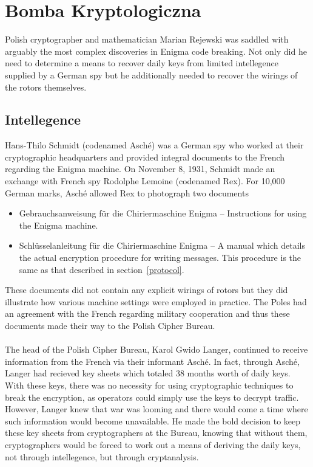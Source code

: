 \chapter{Bomba Kryptologiczna}

Polish cryptographer and mathematician Marian Rejewski was saddled with arguably the most complex discoveries in
Enigma code breaking. Not only did he need to determine a means to
recover daily keys from limited intellegence supplied by a German spy but he
additionally needed to recover the wirings of the rotors themselves.

\section{Intellegence}

Hans-Thilo Schmidt (codenamed Asché) was a German spy who worked at their cryptographic headquarters and provided integral documents to the French regarding the Enigma machine. On November 8, 1931, Schmidt made an exchange with French spy Rodolphe Lemoine (codenamed Rex). For 10,000 German marks,  Asché allowed Rex to photograph two documents
\begin{itemize}
	\item Gebrauchsanweisung für die Chiriermaschine
	      Enigma -- Instructions for using the Enigma machine.
	\item Schlüsselanleitung für die Chiriermaschine Enigma -- A manual which details the actual encryption procedure for writing messages. This procedure is the same as that described in section~\ref{protocol}.
\end{itemize}
These documents did not contain any explicit wirings of rotors but they did illustrate how various machine settings were employed in practice. The Poles had an agreement with the French regarding military cooperation and thus these documents made their way to the Polish Cipher Bureau.
\\\\The head of the Polish Cipher Bureau, Karol Gwido Langer, continued to receive information from the French via their informant Asché. In fact, through Asché, Langer had recieved key sheets which totaled 38 months worth of daily keys. With these keys, there was no necessity for using cryptographic techniques to break the encryption, as operators could simply use the keys to decrypt traffic. However, Langer knew that war was looming and there would come a time where such information would become unavailable. He made the bold decision to keep these key sheets from cryptographers at the Bureau, knowing that without them, cryptographers would be forced to work out a means of deriving the daily keys, not through intellegence, but through cryptanalysis.
